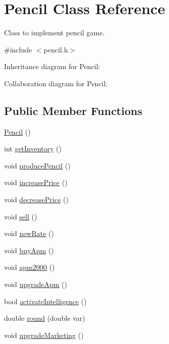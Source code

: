 \hypertarget{classPencil}{}\section{Pencil Class Reference}
\label{classPencil}


Class to implement pencil game.  




{\ttfamily \#include $<$pencil.\+h$>$}



Inheritance diagram for Pencil\+:


Collaboration diagram for Pencil\+:
\subsection*{Public Member Functions}
\begin{DoxyCompactItemize}
\item 
\hyperlink{classPencil_a0dbfad3eebde26e9d5dacace449d9e14}{Pencil} ()
\item 
int \hyperlink{classPencil_aa629f185016565c847bb0a401634f0e5}{get\+Inventory} ()
\item 
void \hyperlink{classPencil_ae966b635fd81f8d346aaa7f8f782f143}{produce\+Pencil} ()
\item 
void \hyperlink{classPencil_a075683b2e85f8819e71f365c097e5f61}{increase\+Price} ()
\item 
void \hyperlink{classPencil_a84aeeb98b1caa424d92c312e56e42797}{decrease\+Price} ()
\item 
void \hyperlink{classPencil_a2731dadbd64edeee0a1cc773a79eee24}{sell} ()
\item 
void \hyperlink{classPencil_a759af90fe58f6399e831f2c53c0470bd}{new\+Rate} ()
\item 
void \hyperlink{classPencil_a506c7c9587a026f1238e880b1b103c2f}{buy\+Apm} ()
\item 
void \hyperlink{classPencil_ad1f8942401865e05d2a220f64a309f3e}{apm2000} ()
\item 
void \hyperlink{classPencil_aaeb664bbf0ab3796bc548eccee5924ed}{upgrade\+Apm} ()
\item 
bool \hyperlink{classPencil_a9288c33b601a667ebd40ba121c8bed36}{activate\+Intelligence} ()
\item 
double \hyperlink{classPencil_a9bbb66405447f4cc218ecbd1a09b7c3b}{round} (double var)
\item 
void \hyperlink{classPencil_a4d1fff5599020013b3b52cf84d714847}{upgrade\+Marketing} ()
\end{DoxyCompactItemize}
